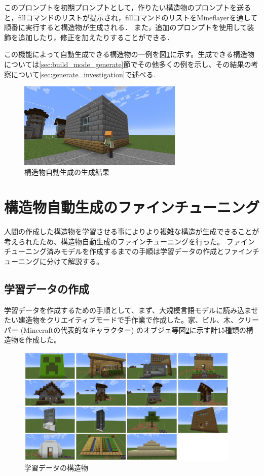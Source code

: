 このプロンプトを初期プロンプトとして，作りたい構造物のプロンプトを送ると，fillコマンドのリストが提示され，fillコマンドのリストをMineflayerを通して順番に実行すると構造物が生成される．
また，追加のプロンプトを使用して装飾を追加したり，修正を加えたりすることができる．

この機能によって自動生成できる構造物の一例を図\ref{fig:generate_example}に示す。生成できる構造物については\ref{sec:build_mode_generate}節でその他多くの例を示し、その結果の考察について\ref{sec:generate_investigation}で述べる.

\begin{figure}[H]
    \centering
    \includegraphics[width=0.7\textwidth]{fig/generate_example.png}
    \caption{構造物自動生成の生成結果}
    \label{fig:generate_example}
\end{figure}

\section{構造物自動生成のファインチューニング}
人間の作成した構造物を学習させる事によりより複雑な構造が生成できることが考えられたため、構造物自動生成のファインチューニングを行った。
ファインチューニング済みモデルを作成するまでの手順は学習データの作成とファインチューニングに分けて解説する。

\subsection{学習データの作成}
学習データを作成するための手順として、まず、大規模言語モデルに読み込ませたい建造物をクリエイティブモードで手作業で作成した。家、ビル、木、クリーパー (Minecraftの代表的なキャラクター) のオブジェ等図\ref{fig:train_structure}に示す計15種類の構造物を作成した。

\begin{figure}[H]
    \centering
    \includegraphics[width=0.95\textwidth]{fig/train_data.PNG}
    \caption{学習データの構造物}
    \label{fig:train_structure}
\end{figure}

